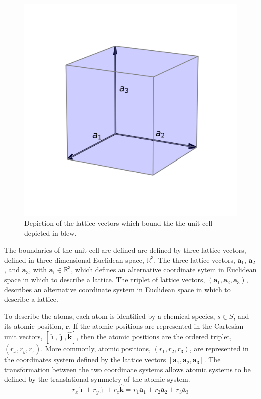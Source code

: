 \begin{figure}[h]
	\centering
  \includegraphics{chapter3/unit_cell}
  \caption{Depiction of the lattice vectors which bound the the unit cell depicted in blew.}
  \label{fig:unit_cell}
\end{figure}

The boundaries of the unit cell are defined are defined by three lattice vectors, defined in three dimensional Euclidean space, $\mathbb{R}^3$.
The three lattice vectors, $\bm{a}_1$, $\bm{a}_2$, and $\bm{a}_3$, with $\bm{a_i}\in\mathbb{R}^3$, which defines an alternative coordinate sytem in Euclidean space in which to describe a lattice.
The triplet of lattice vectors, $(\bm{a}_1,\bm{a}_2,\bm{a}_3)$, describes an alternative coordinate system in Euclidean space in which to describe a lattice.

To describe the atoms, each atom is identified by a chemical species, $s\in S$, and its atomic position, $\bm{r}$.
If the atomic positions are represented in the Cartesian unit vectors, $[\hat{\bm{\imath}},\hat{\bm{\jmath}},\hat{\bm{k}}]$, then the atomic positions are the ordered triplet, $(r_x,r_y,r_z)$.
More commonly, atomic positions, $(r_1,r_2,r_3)$, are represented in the coordinates system defined by the lattice vectors $[\bm{a}_1,\bm{a}_2,\bm{a}_3]$.
The transformation between the two coordinate systems allows atomic systems to be defined by the translational symmetry of the atomic system.
\begin{equation}
	\label{eq:fractional_vs_cartesian_coordinates}
	r_x \hat{\bm{\imath}} + r_y \hat{\bm{\jmath}} + r_z \hat{\bm{k}}
	=
	r_1 \bm{a}_1 + r_2 \bm{a}_2 + r_3 \bm{a}_3
\end{equation}

